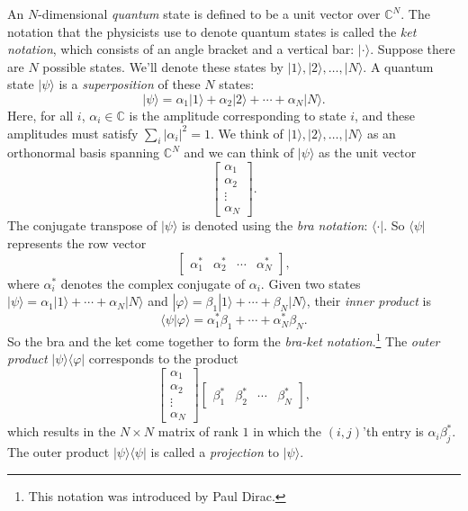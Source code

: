 \documentclass[11pt]{report}
\theoremstyle{plain}
\theoremstyle{definition}
\newcommand{\C}{{\mathbb C}}
\renewcommand{\bra}[1]{\langle#1|}
\renewcommand{\ket}[1]{|#1\rangle}
\newcommand{\braket}[2]{\langle#1|#2\rangle}
\newcommand{\ketbra}[2]{|#1\rangle\!\langle#2|}
\begin{document}
An $N$-dimensional \emph{quantum} state is defined to be a unit vector over $\C^N$. The notation that the physicists use to denote quantum states is called the \emph{ket notation}, which consists of an angle bracket and a vertical bar: $\ket{\cdot}$. Suppose there are $N$ possible states. We'll denote these states by $\ket{1}, \ket{2}, \ldots, \ket{N}$. A quantum state $\ket{\psi}$ is a \emph{superposition} of these $N$ states:
\[
\ket{\psi} = \alpha_1 \ket{1} + \alpha_2 \ket{2} + \cdots + \alpha_N \ket{N}.
\]
Here, for all $i$, $\alpha_i \in \C$ is the amplitude corresponding to state $i$, and these amplitudes must satisfy $\sum_i |\alpha_i|^2 = 1$. We think of $\ket{1}, \ket{2}, \ldots, \ket{N}$ as an orthonormal basis spanning $\C^N$ and we can think of $\ket{\psi}$ as the unit vector
\[
\begin{bmatrix}
\alpha_1 \\
\alpha_2 \\
\vdots \\
\alpha_N
\end{bmatrix}.
\]
The conjugate transpose of $\ket{\psi}$ is denoted using the \emph{bra notation}: $\bra{\cdot}$. So $\bra{\psi}$ represents the row vector
\[
\begin{bmatrix}
\alpha_1^* & \alpha_2^* & \cdots & \alpha_N^*
\end{bmatrix},
\]
where $\alpha_i^*$ denotes the complex conjugate of $\alpha_i$. Given two states $\ket{\psi} = \alpha_1 \ket{1} + \cdots + \alpha_N \ket{N}$ and $\ket{\varphi} = \beta_1 \ket{1} + \cdots + \beta_N \ket{N}$, their \emph{inner product} is
\[
\braket{\psi}{\varphi} = \alpha_1^* \beta_1 + \cdots + \alpha_N^* \beta_N.
\]
So the bra and the ket come together to form the \emph{bra-ket notation}.\footnote{This notation was introduced by Paul Dirac.} The \emph{outer product} $\ketbra{\psi}{\varphi}$ corresponds to the product
\[
\begin{bmatrix}
\alpha_1 \\
\alpha_2 \\
\vdots \\
\alpha_N
\end{bmatrix}
\begin{bmatrix}
\beta_1^* & \beta_2^* & \cdots & \beta_N^*
\end{bmatrix},
\]
which results in the $N \times N$ matrix of rank $1$ in which the $(i, j)$'th entry is $\alpha_i \beta_j^*$. The outer product $\ketbra{\psi}{\psi}$ is called a \emph{projection} to $\ket{\psi}$.
\end{document}
